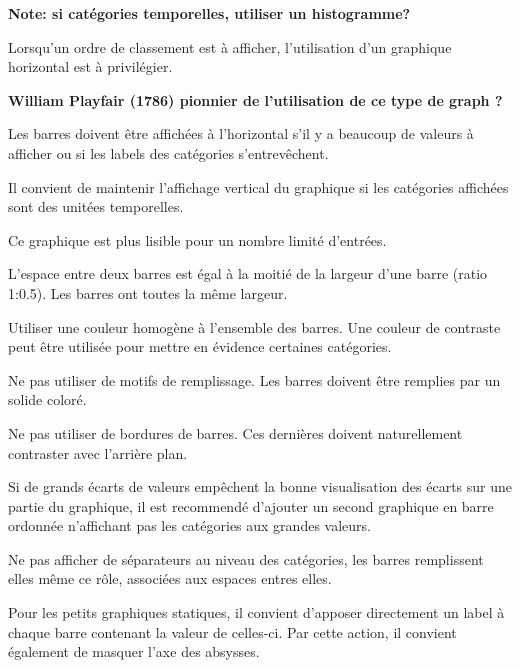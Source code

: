 \documentclass[a4paper,12pt]{article}
\begin{document}
\begin{multicols}{2}
\textbf{Note: si catégories temporelles, utiliser un histogramme?}

Lorsqu'un ordre de classement est à afficher, l'utilisation d'un graphique horizontal est à privilégier. \autocite{andreaskrauseBestPracticesData2024}

\textbf{William Playfair (1786) pionnier de l'utilisation de ce type de graph ?}

Les barres doivent être affichées à l'horizontal s'il y a beaucoup de valeurs à afficher ou si les labels des catégories s'entrevêchent. \autocite{alansmithLexiqueVisuel,sosulskiGraphics2019,wilkeVisualizingAmounts2019,stephenfewComponentlevelGraphDesign2012,jonathanschwabishComparingCategories2021}

Il convient de maintenir l'affichage vertical du graphique si les catégories affichées sont des unitées temporelles. \autocite{stephenfewComponentlevelGraphDesign2012}

Ce graphique est plus lisible pour un nombre limité d'entrées. \autocite{mikeyiHowChooseRight2020}

L'espace entre deux barres est égal à la moitié de la largeur d'une barre (ratio 1:0.5). Les barres ont toutes la même largeur. \autocite{stephenfewComponentlevelGraphDesign2012}

Utiliser une couleur homogène à l'ensemble des barres. Une couleur de contraste peut être utilisée pour mettre en évidence certaines catégories.

Ne pas utiliser de motifs de remplissage. Les barres doivent être remplies par un solide coloré. \autocite{stephenfewComponentlevelGraphDesign2012}

Ne pas utiliser de bordures de barres. Ces dernières doivent naturellement contraster avec l'arrière plan.

Si de grands écarts de valeurs empêchent la bonne visualisation des écarts sur une partie du graphique, il est recommendé d'ajouter un second graphique en barre ordonnée n'affichant pas les catégories aux grandes valeurs. \autocite{jonathanschwabishComparingCategories2021}

Ne pas afficher de séparateurs au niveau des catégories, les barres remplissent elles même ce rôle, associées aux espaces entres elles. \autocite{jonathanschwabishComparingCategories2021}

Pour les petits graphiques statiques, il convient d'apposer directement un label à chaque barre contenant la valeur de celles-ci. Par cette action, il convient également de masquer l'axe des absysses. \autocite{jonathanschwabishComparingCategories2021}


\end{multicols}
\end{document}
